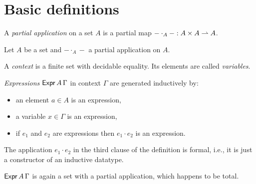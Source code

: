 %

\chapter{Basic definitions}

\begin{definition}
  \label{def:PartialApplication}
  \leanok
  A \emph{partial application} on a set $A$ is a partial map ${-} \cdot_A {-} : A \times A \rightharpoonup A$.
\end{definition}

Let $A$ be a set and ${-} \cdot_A {-}$ a partial application on $A$.

\begin{definition}
  \label{def:Context}
  A \emph{context} is a finite set with decidable equality. Its elements are called \emph{variables}.
\end{definition}

\begin{definition}
  \label{def:Expr}
  \leanok
  \emph{Expressions} $\mathsf{Expr}\,A\,\Gamma$ in context $\Gamma$ are generated inductively by:
  \begin{itemize}
    \item an element $a \in A$ is an expression,
    \item a variable $x \in \Gamma$ is an expression,
    \item if $e_1$ and $e_2$ are expressions then $e_1 \cdot e_2$ is an expression.
  \end{itemize}
\end{definition}

The application $e_1 \cdot e_2$ in the third clause of the definition is formal, i.e., it is just a constructor of an inductive datatype.
%

\begin{proposition}
  \label{prop:Expr.partialApplication}
  $\mathsf{Expr}\,A\,\Gamma$ is again a set with a partial application, which happens to be total.
\end{proposition}


